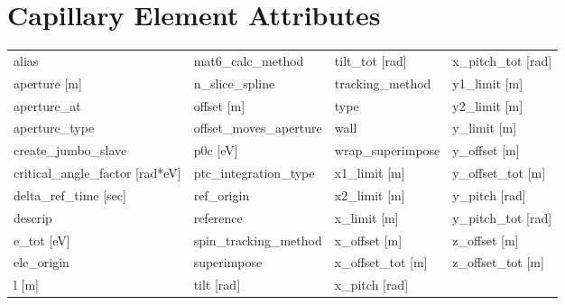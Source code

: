  \begin{tabular}{llll} \toprule
 \bottomrule
 \end{tabular}
 \vfill
 
 \section{Capillary Element Attributes}
 \label{s:list.capillary}
 
 \begin{tabular}{llll} \toprule
alias                            & mat6_calc_method                 & tilt_tot [rad]                   & x_pitch_tot [rad]                \\
aperture [m]                     & n_slice_spline                   & tracking_method                  & y1_limit [m]                     \\
aperture_at                      & offset [m]                       & type                             & y2_limit [m]                     \\
aperture_type                    & offset_moves_aperture            & wall                             & y_limit [m]                      \\
create_jumbo_slave               & p0c [eV]                         & wrap_superimpose                 & y_offset [m]                     \\
critical_angle_factor [rad*eV]   & ptc_integration_type             & x1_limit [m]                     & y_offset_tot [m]                 \\
delta_ref_time [sec]             & ref_origin                       & x2_limit [m]                     & y_pitch [rad]                    \\
descrip                          & reference                        & x_limit [m]                      & y_pitch_tot [rad]                \\
e_tot [eV]                       & spin_tracking_method             & x_offset [m]                     & z_offset [m]                     \\
ele_origin                       & superimpose                      & x_offset_tot [m]                 & z_offset_tot [m]                 \\
l [m]                            & tilt [rad]                       & x_pitch [rad]                    &                                  \\
 \bottomrule
 \end{tabular}
 \vfill
 

